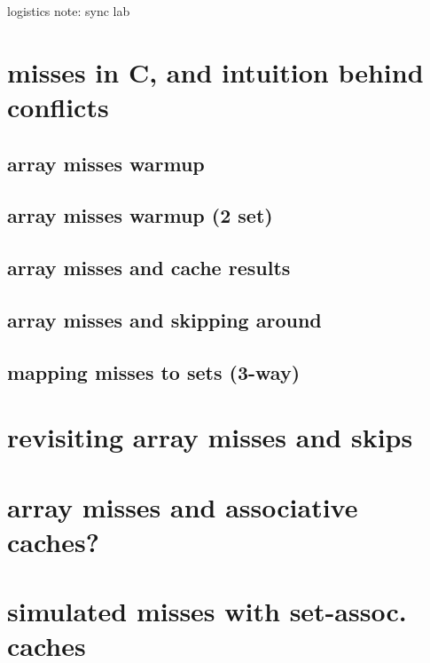 \begin{frame}{logistics note: sync lab}
\section{misses in C, and intuition behind conflicts}


\subsection{array misses warmup}


\subsection{array misses warmup (2 set)}



\subsection{array misses and cache results}


\subsection{array misses and skipping around}


\subsection{mapping misses to sets (3-way)}


\section{revisiting array misses and skips}

\section{array misses and associative caches?}


\section{simulated misses with set-assoc. caches}



\end{frame}
